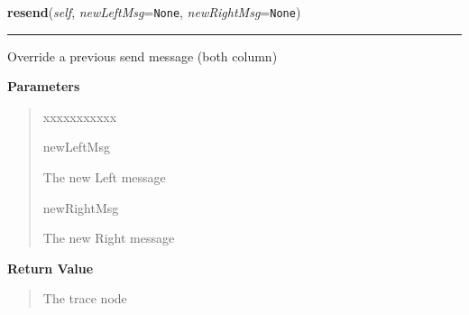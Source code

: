     \label{tracetool:TraceNode:resend}

    \vspace{0.5ex}

\hspace{.8\funcindent}\begin{boxedminipage}{\funcwidth}

    \raggedright \textbf{resend}(\textit{self}, \textit{newLeftMsg}={\tt None}, \textit{newRightMsg}={\tt None})

    \vspace{-1.5ex}

    \rule{\textwidth}{0.5\fboxrule}
\setlength{\parskip}{2ex}
    Override a previous send message (both column)

\setlength{\parskip}{1ex}
      \textbf{Parameters}
      \vspace{-1ex}

      \begin{quote}
        \begin{Ventry}{xxxxxxxxxxx}

          \item[newLeftMsg]

          The new Left message

          \item[newRightMsg]

          The new Right message

        \end{Ventry}

      \end{quote}

      \textbf{Return Value}
    \vspace{-1ex}

      \begin{quote}
      The trace node

      \end{quote}

    \end{boxedminipage}

    \label{tracetool:TraceNode:resendIconIndex}

    \vspace{0.5ex}


